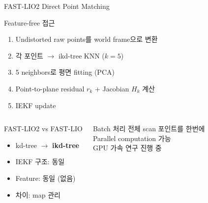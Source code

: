 \begin{frame}{FAST-LIO2 Direct Point Matching}
  \begin{block}{Feature-free 접근}
    \begin{enumerate}
      \item Undistorted raw points를 world frame으로 변환
      \item 각 포인트 $\to$ ikd-tree KNN ($k=5$)
      \item 5 neighbors로 평면 fitting (PCA)
      \item Point-to-plane residual $r_k$ + Jacobian $H_k$ 계산
      \item IEKF update
    \end{enumerate}
  \end{block}
  \pause
  \begin{columns}
    \begin{block}{FAST-LIO2 vs FAST-LIO}
      \begin{itemize}
        \item kd-tree $\to$ \textbf{ikd-tree}
        \item IEKF 구조: 동일
        \item Feature: 동일 (없음)
        \item 차이: map 관리
      \end{itemize}
    \end{block}
    \begin{exampleblock}{Batch 처리}
      전체 scan 포인트를 한번에\\
      Parallel computation 가능\\
      GPU 가속 연구 진행 중
    \end{exampleblock}
  \end{columns}
\end{frame}

